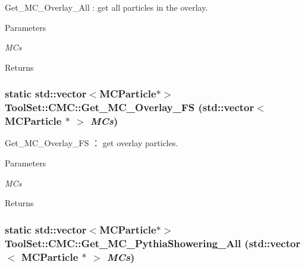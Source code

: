 Get\_\-MC\_\-Overlay\_\-All : get all particles in the overlay. 
\begin{DoxyParams}{Parameters}
\item[{\em MCs}]\end{DoxyParams}
\begin{DoxyReturn}{Returns}

\end{DoxyReturn}
\hypertarget{classToolSet_1_1CMC_a0174dfbf7511f9fa827d9fff33aabc8b}{
\subsubsection[{Get\_\-MC\_\-Overlay\_\-FS}]{\setlength{\rightskip}{0pt plus 5cm}static std::vector$<$MCParticle$\ast$$>$ ToolSet::CMC::Get\_\-MC\_\-Overlay\_\-FS (std::vector$<$ MCParticle $\ast$ $>$ {\em MCs})}}
\label{classToolSet_1_1CMC_a0174dfbf7511f9fa827d9fff33aabc8b}


Get\_\-MC\_\-Overlay\_\-FS ： get overlay particles. 
\begin{DoxyParams}{Parameters}
\item[{\em MCs}]\end{DoxyParams}
\begin{DoxyReturn}{Returns}

\end{DoxyReturn}
\hypertarget{classToolSet_1_1CMC_a96c8f9998df8b19c84b0f45271195ef9}{
\subsubsection[{Get\_\-MC\_\-PythiaShowering\_\-All}]{\setlength{\rightskip}{0pt plus 5cm}static std::vector$<$MCParticle$\ast$$>$ ToolSet::CMC::Get\_\-MC\_\-PythiaShowering\_\-All (std::vector$<$ MCParticle $\ast$ $>$ {\em MCs})}}
\label{classToolSet_1_1CMC_a96c8f9998df8b19c84b0f45271195ef9}


